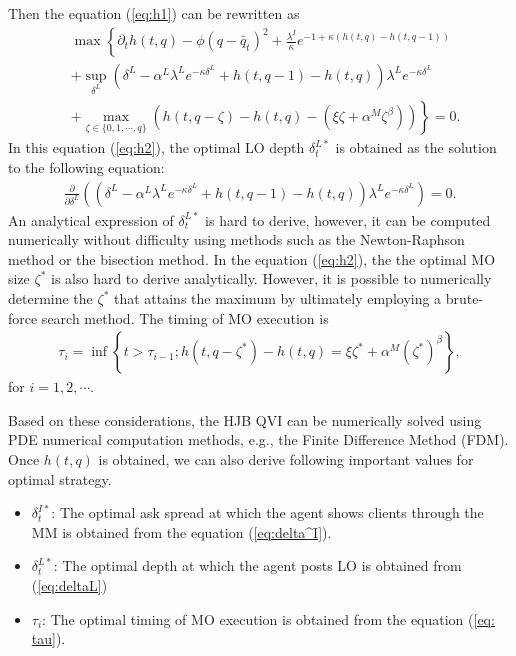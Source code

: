 \documentclass[12pt]{article}
\begin{document}
Then the equation (\ref{eq:h1}) can be rewritten as
\begin{align}
  &\max\left\{\partial_t h(t,q)-\phi (q-\bar{q}_t)^2  + \frac{\lambda^I}{\kappa} e^{-1 + \kappa (h(t, q)-h(t, q-1))} \right. \nonumber\\
  &\left.+\sup_{\delta^L}  \left(\delta^L - \alpha^L\lambda^L e^{-\kappa \delta^L}+h(t, q-1)-h(t, q) \right)\lambda^L e^{-\kappa \delta^L} \right. \nonumber\\
  &\left. + \max_{\zeta\in \{0, 1, \cdots, q\}} \left(h(t, q-\zeta) - h(t, q) - (\xi \zeta + \alpha^M\zeta^{\beta} )\right) \right\} =0. \label{eq:h2}
\end{align}
In this equation (\ref{eq:h2}), the optimal LO depth $\delta^{L*}_t$ is obtained as the solution to the following equation:   
\begin{align}
  \frac{\partial}{\partial \delta^L}  \left(\left(\delta^L - \alpha^L\lambda^L e^{-\kappa \delta^L}+h(t, q-1)-h(t, q) \right)\lambda^L e^{-\kappa \delta^L} \right) = 0.\label{eq:deltaL}
\end{align}
An analytical expression of $\delta^{L*}_t$ is hard to derive, however, it can be computed numerically without difficulty using methods such as the Newton-Raphson method or the bisection method.
In the equation (\ref{eq:h2}), the the optimal MO size $\zeta^*$ is also hard to derive analytically. 
However, it is possible to numerically determine the $\zeta^*$ that attains the maximum by ultimately employing a brute-force search method.
The timing of MO execution is 
\begin{align}
  \tau_i = \inf\left\{t > \tau_{i-1};  h(t, q-\zeta^*) - h(t, q) = \xi \zeta^* + \alpha^M(\zeta^*)^{\beta} \right\},\label{eq: tau}
\end{align}
for $i = 1, 2, \cdots.$

Based on these considerations, the HJB QVI can be numerically solved using PDE numerical computation methods, e.g., the Finite Difference Method (FDM).
Once $h(t, q)$ is obtained, we can also derive following important values for optimal strategy.
\begin{itemize}
  \item $\delta^{I*}_t$: The optimal ask spread at which the agent shows clients through the MM is obtained from the equation (\ref{eq:delta^I}).
  \item $\delta^{L*}_t$: The optimal depth at which the agent posts LO is obtained from (\ref{eq:deltaL})
  \item $\tau_i$: The optimal timing of MO execution is obtained from the equation (\ref{eq: tau}).
\end{itemize}
\end{document}
